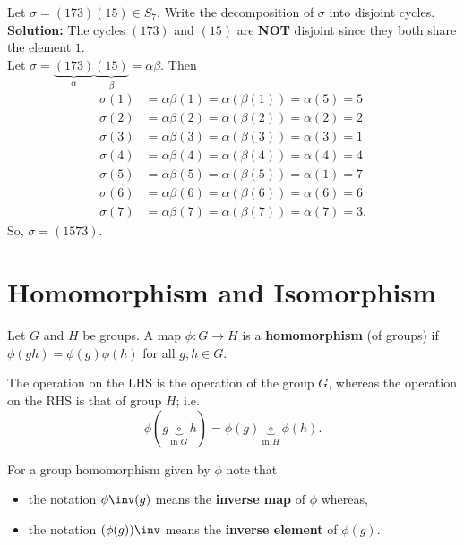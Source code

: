 \documentclass[12pt, a4paper]{article}
\begin{document}
\begin{mdexample}
    Let \(\sigma = (173)(15) \in S_7\). Write the decomposition of \(\sigma\) into disjoint cycles. \\
    \textbf{Solution:} The cycles \((173)\) and \((15)\) are \textbf{NOT} disjoint since they both share the element \(1\). \\
    Let \(\sigma = \underbrace{(173)}_{\alpha} \underbrace{(15)}_{\beta} = \alpha \beta.\) Then 
    \[\begin{aligned}
        \sigma(1) &= \alpha \beta(1) = \alpha(\beta(1)) =\alpha(5) =5 \\
        \sigma(2) &= \alpha \beta(2) = \alpha(\beta(2)) =\alpha(2) =2 \\
        \sigma(3) &= \alpha \beta(3) = \alpha(\beta(3)) =\alpha(3) =1 \\
        \sigma(4) &= \alpha \beta(4) = \alpha(\beta(4)) =\alpha(4) =4 \\
        \sigma(5) &= \alpha \beta(5) = \alpha(\beta(5)) =\alpha(1) =7 \\
        \sigma(6) &= \alpha \beta(6) = \alpha(\beta(6)) =\alpha(6) =6 \\
        \sigma(7) &= \alpha \beta(7) = \alpha(\beta(7)) =\alpha(7) =3.
    \end{aligned}\]
    So, \(\sigma =(1573)\).
\end{mdexample}


\pagebreak

\section{Homomorphism and Isomorphism}

\begin{definition}
    Let \(G\) and \(H\) be groups. A map \(\phi : G \to H\) is a \textbf{homomorphism} (of groups) if \(\phi(gh)=\phi(g)\phi(h)\) for all \(g,h \in G\).
\end{definition}

\begin{mdremark}
    The operation on the LHS is the operation of the group \(G\), whereas the operation on the RHS is that of group \(H\); i.e.
    \[\phi(g \underbrace{\circ}_{\text{in }G} h) = \phi(g) \underbrace{\circ}_{\text{in } H} \phi(h).\]
\end{mdremark}

\begin{mdnote}
    For a group homomorphism given by \(\phi\) note that
    \begin{itemize}
        \item the notation \(\phi\inv(g)\) means the \textbf{inverse map} of \(\phi\) whereas,
        \item the notation \((\phi(g))\inv\) means the \textbf{inverse element} of \(\phi(g)\).
    \end{itemize}
\end{mdnote}
\end{document}
